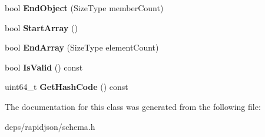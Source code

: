 \begin{DoxyCompactItemize}
\item 
bool {\bfseries End\+Object} (Size\+Type member\+Count)\hypertarget{classinternal_1_1_hasher_a7050f1552d88967944195163a6a0b08e}{}\label{classinternal_1_1_hasher_a7050f1552d88967944195163a6a0b08e}

\item 
bool {\bfseries Start\+Array} ()\hypertarget{classinternal_1_1_hasher_a2ceb3cc00216f6b6ce66907856a16404}{}\label{classinternal_1_1_hasher_a2ceb3cc00216f6b6ce66907856a16404}

\item 
bool {\bfseries End\+Array} (Size\+Type element\+Count)\hypertarget{classinternal_1_1_hasher_ad445b2730be23e18b4dec2c4d1033419}{}\label{classinternal_1_1_hasher_ad445b2730be23e18b4dec2c4d1033419}

\item 
bool {\bfseries Is\+Valid} () const \hypertarget{classinternal_1_1_hasher_abd4cb8325b81217dc34eecf63d47579f}{}\label{classinternal_1_1_hasher_abd4cb8325b81217dc34eecf63d47579f}

\item 
uint64\+\_\+t {\bfseries Get\+Hash\+Code} () const \hypertarget{classinternal_1_1_hasher_ad44fcaf9a12fefb387e9624327572b61}{}\label{classinternal_1_1_hasher_ad44fcaf9a12fefb387e9624327572b61}

\end{DoxyCompactItemize}


The documentation for this class was generated from the following file\+:\begin{DoxyCompactItemize}
\item 
deps/rapidjson/schema.\+h\end{DoxyCompactItemize}

